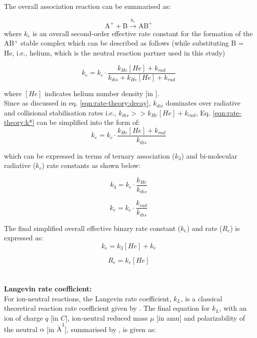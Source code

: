 The overall association reaction can be summarised as:

\[ \text{A}^+ + \text{B} \xrightarrow{k_{e}} \text{AB}^+ \]
where $k_{e}$ is an overall second-order effective rate constant for the formation of the AB$^+$ stable complex which can be described as follows (while substituting B = He, i.e., helium, which is the neutral reaction partner used in this study)

\begin{equation}
    k_{e} = k_c \cdot \frac{k_{He}[He] + k_{rad}}{k_{dis} + k_{He}[He] + k_{rad}} 
    \label{eqn:rate-theory:k*}
\end{equation}

where $[He]$ indicates helium number density [in \percc].\\

Since as discussed in eq. \ref{eqn:rate-theory:decay}, $k_{dis}$ dominates over radiative and collisional stabilisation rates i.e., $k_{dis} >> k_{He}[He] + k_{rad}$, Eq. \ref{eqn:rate-theory:k*} can be simplified into the form of:
\[ k_{e} = k_c \cdot \frac{k_{He}[He] + k_{rad}}{k_{dis}} \]

which can be expressed in terms of ternary association ($k_3$) and bi-molecular radiative ($k_r$) rate constants
as shown below:

\begin{equation}
    k_3 = k_c \cdot \frac{k_{He}}{k_{dis}}
    \label{eqn:rate-theory:k3}
\end{equation}

\begin{equation}
    k_r = k_c \cdot \frac{k_{rad}}{k_{dis}}
    \label{eqn:rate-theory:kr}
\end{equation}

The final simplified overall effective binary rate constant ($k_{e}$) and rate ($R_{e}$) is expressed as:
\begin{equation}
    k_{e} = k_3[He] + k_r
    \label{eqn:rate-theory:k*-simplified}
\end{equation}

\begin{equation}
    R_{e} = k_{e}[He]
    \label{eqn:rate-theory:R*-simplified}
\end{equation}
\\\\
\textbf{Langevin rate coefficient:}\\
For ion-neutral reactions, the Langevin rate coefficient, $k_L$, is a classical theoretical reaction rate coefficient given by \citet{langevin_notitle_1905}.  The final equation for $k_L$, with an ion of charge $q$ [in $C$], ion-neutral reduced mass $\mu$ [in amu] and polarizability of the neutral $\alpha$ [in $\mathring{\text{A}}^3$], summarised by \citet{asvany_numerical_2009}, is given as:
\label{discussions:Langevin}

